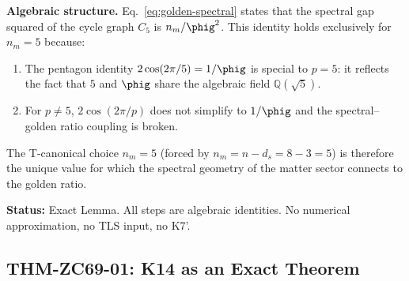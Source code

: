 \documentclass[12pt, a4paper]{article}
\begin{document}
\begin{formalbox}[title={LEM-ZC69-01: $[\lamtwo(\Zfi)]^{2} = 5/\phig^{2}$
  --- Golden Spectral Identity ($R_0$, Exact)}]
\textbf{Algebraic structure.}
Eq.~\eqref{eq:golden-spectral} states that the spectral
gap squared of the cycle graph $C_5$ is $n_m/\phig^2$.
This identity holds exclusively for $n_m = 5$ because:
\begin{enumerate}[leftmargin=2em, noitemsep]
  \item The pentagon identity $2\cos(2\pi/5) = 1/\phig$
    is special to $p=5$: it reflects the fact that $5$
    and $\phig$ share the algebraic field $\mathbb{Q}(\sqrt{5})$.
  \item For $p \neq 5$, $2\cos(2\pi/p)$ does not simplify
    to $1/\phig$ and the spectral--golden ratio coupling
    is broken.
\end{enumerate}
The T-canonical choice $n_m = 5$ (forced by
$n_m = n - d_s = 8 - 3 = 5$) is therefore the unique
value for which the spectral geometry of the matter sector
connects to the golden ratio.

\textbf{Status:} Exact Lemma.
All steps are algebraic identities.
No numerical approximation, no TLS input, no K7'.
\end{formalbox}

\subsection{THM-ZC69-01: K14 as an Exact Theorem}
\label{sec:thm01}

\end{document}
